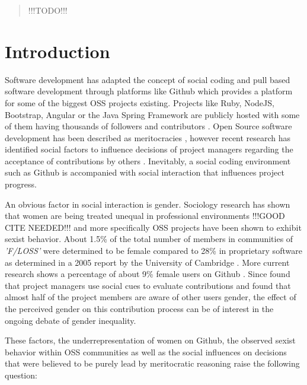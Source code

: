 \begin{abstract}%
!!!TODO!!! %
\end{abstract}


\section{Introduction}\label{Introduction}

Software development has adapted the concept of social coding and pull based software development through platforms like Github which provides a platform for some of the biggest \ac{OSS} projects existing. Projects like Ruby, NodeJS, Bootstrap, Angular or the Java Spring Framework are publicly hosted with some of them having thousands of followers and contributors \cite{Gousi13}. Open Source software development has been described as meritocracies \cite{Scacchi:2007:FSS:1295014.1295019}, however recent research has identified social factors to influence decisions of project managers regarding the acceptance of contributions by others \cite{Tsay:2014:IST:2568225.2568315}. Inevitably, a social coding environment such as Github is accompanied with social interaction that influences project progress.

An obvious factor in social interaction is gender. Sociology research has shown that women are being treated unequal in professional environments !!!GOOD CITE NEEDED!!! %
and more specifically \ac{OSS} projects have been shown to exhibit sexist behavior. About 1.5\% of the total number of members in communities of \emph{'\ac{F/LOSS}'} were determined to be female compared to 28\% in proprietary software as determined in a 2005 report by the University of Cambridge \cite{flosspols-gender:2005}. More current research shows a percentage of about 9\% female users on Github \cite{Vasilescu:2015:GTD:2702123.2702549}. Since
\citeauthor{Tsay:2014:IST:2568225.2568315} found that project managers use social cues to evaluate contributions and \citeauthor{Vasilescu:2015:GTD:2702123.2702549} found that almost half of the project members are aware of other users gender, the effect of the perceived gender on this contribution process can be of interest in the ongoing debate of gender inequality.

These factors, the underrepresentation of women on Github, the observed sexist behavior within \ac{OSS} communities as well as the social influences on decisions that were believed to be purely lead by meritocratic reasoning raise the following question:

